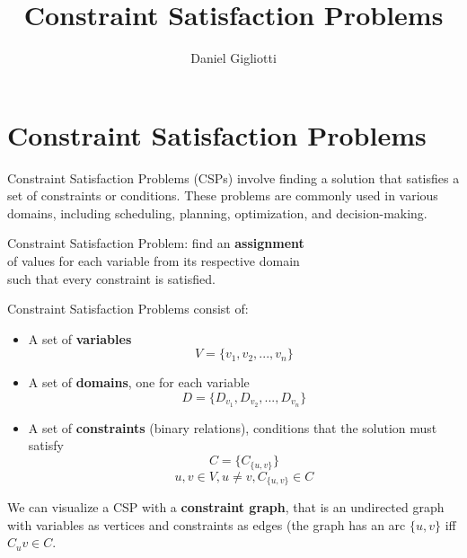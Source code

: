 \documentclass{article}
\title{Constraint Satisfaction Problems}
\author{Daniel Gigliotti}
\date{}
\begin{document}
\maketitle

\section{Constraint Satisfaction Problems}

Constraint Satisfaction Problems (CSPs) involve finding a solution that satisfies a set of constraints or conditions. These problems are commonly used in various domains, including scheduling, planning, optimization, and decision-making.

\begin{center}
    Constraint Satisfaction Problem: find an \textbf{assignment} \\ of values for each variable from its respective domain \\ such that every constraint is satisfied.
\end{center}

Constraint Satisfaction Problems consist of:
\begin{itemize}
    \item A set of \textbf{variables}
    \begin{equation*}
        V = \{v_1, v_2, ..., v_n\}
    \end{equation*}
    \item A set of \textbf{domains}, one for each variable
    \begin{equation*}
        D = \{D_{v_1}, D_{v_2}, ..., D_{v_n}\}
    \end{equation*}
    \item A set of \textbf{constraints} (binary relations), conditions that the solution must satisfy
    \begin{equation*}
        C = \{C_{\{u, v\}}\}
    \end{equation*}
    \begin{equation*}
        u, v \in V, u \neq v, C_{\{u, v\}} \in C
    \end{equation*}
\end{itemize}

We can visualize a CSP with a \textbf{constraint graph}, that is an undirected graph with variables as vertices and constraints as edges (the graph has an arc $\{u, v\}$ iff $C_uv \in C$. \\
\end{document}
